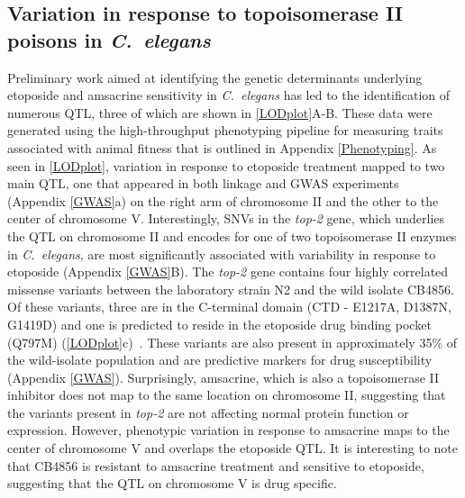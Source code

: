 \documentclass[12pt]{article}
\begin{document}
\subsection{Variation in response to topoisomerase II poisons in {\itshape C.~elegans}}\label{preliminary}

Preliminary work aimed at identifying the genetic determinants underlying etoposide and amsacrine sensitivity in {\it C.~elegans} has led to the identification of numerous QTL, three of which are shown in \autoref{LODplot}A-B. These data were generated using the high-throughput phenotyping pipeline for measuring traits associated with animal fitness that is outlined in Appendix \autoref{Phenotyping}. As seen in \autoref{LODplot}, variation in response to etoposide treatment mapped to two main QTL, one that appeared in both linkage and GWAS experiments (Appendix \autoref{GWAS}a) on the right arm of chromosome II and the other to the center of chromosome V. Interestingly, SNVs in the {\it top-2} gene, which underlies the QTL on chromosome II and encodes for one of two topoisomerase II enzymes in {\it C.~elegans}, are most significantly associated with variability in response to etoposide (Appendix \autoref{GWAS}B). The {\it top-2} gene contains four highly correlated missense variants between the laboratory strain N2 and the wild isolate CB4856. Of these variants, three are in the C-terminal domain (CTD - 	E1217A, D1387N, G1419D) and one is predicted to reside in the etoposide drug binding pocket (Q797M) (\autoref{LODplot}c)~\cite{Sanchez:2011jn}. These variants are also present in approximately 35\% of the wild-isolate population and are predictive markers for drug susceptibility (Appendix \autoref{GWAS}). Surprisingly, amsacrine, which is also a topoisomerase II inhibitor does not map to the same location on chromosome II, suggesting that the variants present in {\it top-2} are not affecting normal protein function or expression. However, phenotypic variation in response to amsacrine maps to the center of chromosome V and overlaps the etoposide QTL. It is interesting to note that CB4856 is resistant to amsacrine treatment and sensitive to etoposide, suggesting that the QTL on chromosome V is drug specific.
\end{document}
